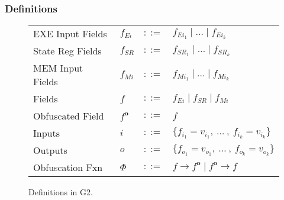 \documentclass[sigconf,usenames,dvipsnames,svgnames,table]{acmart}
\newcommand{\obf}[1]{#1^\mathbf{o}}
\def \sysname {\textsc{G2}\xspace}
\begin{document}
      \subsubsection{Definitions}\label{sec:spec:synt:defn}
        \begin{figure}
          \centering
          \begin{tabular}{l l c l}
            EXE Input Fields & $f_{Ei}$  & $::=$ & $f_{Ei_{1}} \mid \dots \mid f_{Ei_{k}}$\\
            State Reg Fields & $f_{SR}$  & $::=$ & $f_{SR_{1}} \mid \dots \mid f_{SR_{k}}$\\
            MEM Input Fields & $f_{Mi}$  & $::=$ & $f_{Mi_{1}} \mid \dots \mid f_{Mi_{k}}$\\
            Fields           & $f$       & $::=$ & $f_{Ei} \mid f_{SR} \mid f_{Mi} $ \\
            Obfuscated Field & $\obf{f}$ & $::=$ & $f$\\
            Inputs           & $i$       & $::=$ & $\{f_{i_{1}} = v_{i_{1}} ,\ \dots\ ,\ f_{i_{k}} = v_{i_{k}}\}$\\
            Outputs          & $o$       & $::=$ & $\{f_{o_{1}} = v_{o_{1}} ,\ \dots\ ,\ f_{o_{k}} = v_{o_{k}}\}$\\
            Obfuscation Fxn  & $\Phi$    & $::=$ & $f \rightarrow \obf{f} \mid \obf{f} \rightarrow f$
          \end{tabular}
          \caption{Definitions in \sysname.}
          \label{fig:spec:synt:defn}
        \end{figure}

\end{document}
